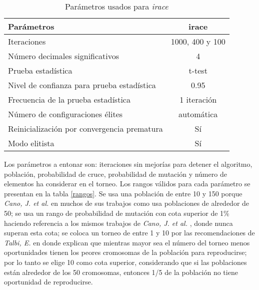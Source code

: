 \begin{table}[]
\centering
\begin{tabular}{l c}
\hline
Parámetros & irace \\
\hline
\hline
Iteraciones                                 &  1000, 400 y 100\\
Número decimales significativos             &    4            \\
Prueba estadística                          &  t-test         \\
Nivel de confianza para prueba estadística  &  0.95           \\
Frecuencia de la prueba estadística         &    1 iteración  \\
Número de configuraciones élites            &  automática     \\
Reinicialización por convergencia prematura &     Sí          \\
Modo elitista                               &     Sí          \\

\hline
\end{tabular}
\caption{Parámetros usados para \emph{irace}}
\label{irace-param}
\end{table}

Los parámetros a entonar son: iteraciones sin mejorías para detener el algoritmo, población, probabilidad de cruce, probabilidad de mutación y número de elementos ha considerar en el torneo. Los rangos válidos para cada parámetro se presentan en la tabla \ref{rangos}. Se usa una población de entre 10  y 150 porque \emph{Cano, J. et al.} en muchos de sus trabajos como \cite{de2004reduccion} usa poblaciones de alrededor de 50; se usa un rango de probabilidad de mutación con cota superior de 1\% haciendo referencia a los mismos trabajos de \emph{Cano, J. et al.} \cite{de2004reduccion,garcia2012prototype,garcia2008memetic}, donde nunca superan esta cota; se coloca un torneo de entre 1 y 10 por las recomendaciones de \emph{Talbi, E.} en \cite{talbi2009metaheuristics} donde explican que mientras mayor sea el número del torneo menos oportunidades tienen los peores cromosomas de la población para reproducirse; por lo tanto se elige 10 como cota superior, considerando que si las poblaciones están alrededor de los 50 cromosomas, entonces 1/5 de la población no tiene oportunidad de reproducirse.

